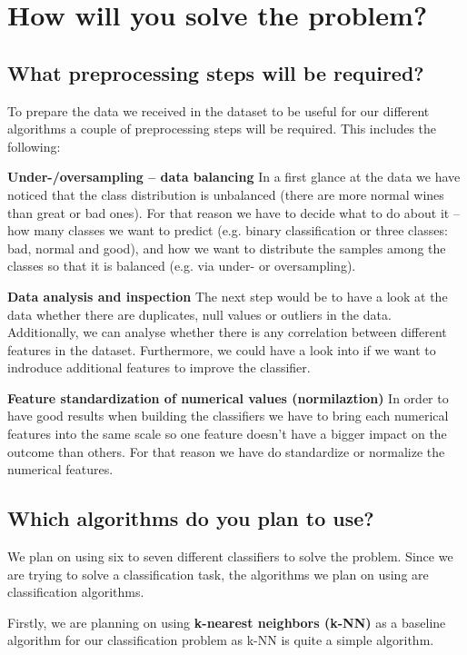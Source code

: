 \documentclass[11pt,titlepage,oneside,openany]{article}
\begin{document}
\section{How will you solve the problem?}
\subsection{What preprocessing steps will be required?}
To prepare the data we received in the dataset to be useful for our different algorithms a couple of preprocessing
steps will be required. This includes the following:

\textbf{Under-/oversampling -- data balancing} In a first glance at the data we have noticed that the class distribution is
unbalanced (there are more normal wines than great or bad ones). For that reason we have to decide what to do about it -- how many classes we want to predict (e.g. binary classification or three classes: bad, normal and good), and how we want to distribute the samples among the classes so that it is balanced (e.g. via under- or oversampling).

\textbf{Data analysis and inspection} The next step would be to have a look at the data whether there are duplicates, null values or outliers in the data. Additionally, we can analyse whether there is any correlation between different features in the dataset. Furthermore, we could have a look into if we want to indroduce additional features to improve the classifier.

\textbf{Feature standardization of numerical values (normilaztion)} In order to have good results when building the classifiers we have to bring each numerical features into the same scale so one feature doesn't have a bigger impact on the outcome than others. For that reason we have do standardize or normalize the numerical features.

\subsection{Which algorithms do you plan to use?}
We plan on using six to seven different classifiers to solve the problem. Since we 
are trying to solve a classification task, the algorithms we plan on using are classification
algorithms.

Firstly, we are planning on using \textbf{k-nearest neighbors (k-NN)} as a baseline
algorithm for our classification problem as k-NN is quite a simple algorithm.
\end{document}
